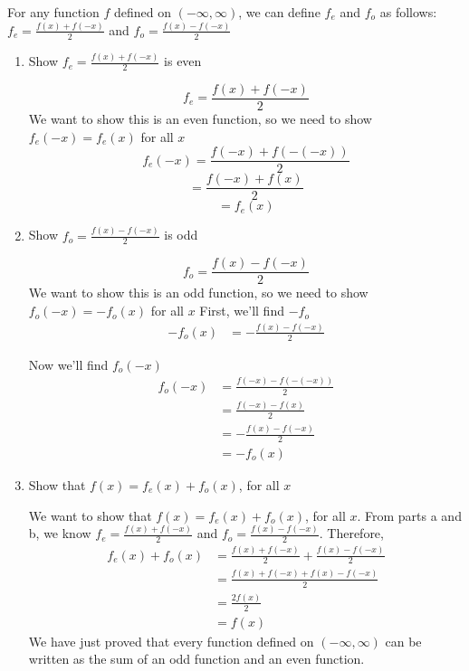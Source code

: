 \documentclass[nooutcomes]{ximera}
\begin{document}
\begin{problem}
For any function $f$ defined on $(-\infty,\infty)$, we can define $f_e$ and $f_o$ as follows: $f_e=\frac{f(x)+f(-x)}{2}$ and $f_o=\frac{f(x)-f(-x)}{2}$


\begin{enumerate}	
	\item  Show  $f_e=\frac{f(x)+f(-x)}{2}$  is even
		\begin{freeResponse}	
			 $$f_e=\frac{f(x)+f(-x)}{2}$$
			We want to show this is an even function, so we need to show $f_e(-x)=f_e(x)$ for all $x$
			$$f_e(-x)=\frac{f(-x)+f(-(-x))}{2}$$ 
			$$=\frac{f(-x)+f(x)}{2}$$
			$$=f_e(x)$$
		\end{freeResponse}

	\item  Show $f_o=\frac{f(x)-f(-x)}{2}$ is odd
		\begin{freeResponse}	
			 $$f_o=\frac{f(x)-f(-x)}{2}$$
			We want to show this is an odd function, so we need to show $f_o(-x)=-f_o(x)$ for all $x$
			First, we'll find $-f_o$
			\begin{align*}
			-f_o(x)&=-\frac{f(x)-f(-x)}{2}
			\end{align*}

			Now we'll find $f_o(-x)$
			\begin{align*}
			f_o(-x)&=\frac{f(-x)-f(-(-x))}{2}\\
			&=\frac{f(-x)-f(x)}{2}\\
			&=-\frac{f(x)-f(-x)}{2}\\
			&=-f_o(x)
			\end{align*}
			
		\end{freeResponse}
	\item Show that $f(x)=f_e(x)+f_o(x)$, for all $x$
		\begin{freeResponse}
		
		We want to show that $f(x)=f_e(x)+f_o(x)$, for all $x$.  From parts a and b, we know $f_e=\frac{f(x)+f(-x)}{2}$ and $f_o=\frac{f(x)-f(-x)}{2}$.  Therefore,
			\begin{align*}
			f_e(x)+f_o(x)&=\frac{f(x)+f(-x)}{2}+\frac{f(x)-f(-x)}{2}\\
			&=\frac{f(x)+f(-x)+f(x)-f(-x)}{2}\\
			&=\frac{2f(x)}{2}\\
			&=f(x)
			\end{align*}
		We have just proved that every function defined on $(-\infty,\infty)$ can be written as the sum of an odd function and an even function.
	

\end{freeResponse}
\end{enumerate}
\end{problem}
\end{document}
